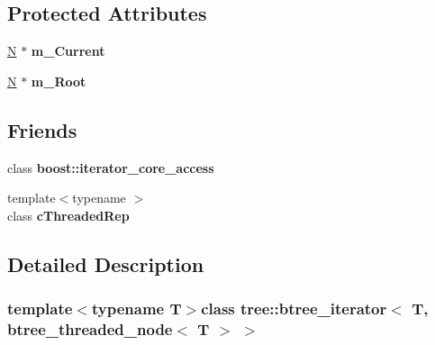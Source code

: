 \subsection*{Protected Attributes}
\begin{DoxyCompactItemize}
\item 
\hypertarget{classtree_1_1btree__iterator_3_01T_00_01btree__threaded__node_3_01T_01_4_01_4_a95443920e3a32b37c162c69cd41e6c96}{\hyperlink{structtree_1_1btree__threaded__node}{N} $\ast$ {\bfseries m\-\_\-\-Current}}\label{classtree_1_1btree__iterator_3_01T_00_01btree__threaded__node_3_01T_01_4_01_4_a95443920e3a32b37c162c69cd41e6c96}

\item 
\hypertarget{classtree_1_1btree__iterator_3_01T_00_01btree__threaded__node_3_01T_01_4_01_4_a8be171dbc88d3daf451dee7d7b969bf3}{\hyperlink{structtree_1_1btree__threaded__node}{N} $\ast$ {\bfseries m\-\_\-\-Root}}\label{classtree_1_1btree__iterator_3_01T_00_01btree__threaded__node_3_01T_01_4_01_4_a8be171dbc88d3daf451dee7d7b969bf3}

\end{DoxyCompactItemize}
\subsection*{Friends}
\begin{DoxyCompactItemize}
\item 
\hypertarget{classtree_1_1btree__iterator_3_01T_00_01btree__threaded__node_3_01T_01_4_01_4_ac09f73e325921cc50ebcd96bed0f8096}{class {\bfseries boost\-::iterator\-\_\-core\-\_\-access}}\label{classtree_1_1btree__iterator_3_01T_00_01btree__threaded__node_3_01T_01_4_01_4_ac09f73e325921cc50ebcd96bed0f8096}

\item 
\hypertarget{classtree_1_1btree__iterator_3_01T_00_01btree__threaded__node_3_01T_01_4_01_4_aaa5ba4484341fef93d9f0f42304b1290}{{\footnotesize template$<$typename $>$ }\\class {\bfseries c\-Threaded\-Rep}}\label{classtree_1_1btree__iterator_3_01T_00_01btree__threaded__node_3_01T_01_4_01_4_aaa5ba4484341fef93d9f0f42304b1290}

\end{DoxyCompactItemize}


\subsection{Detailed Description}
\subsubsection*{template$<$typename T$>$class tree\-::btree\-\_\-iterator$<$ T, btree\-\_\-threaded\-\_\-node$<$ T $>$ $>$}

